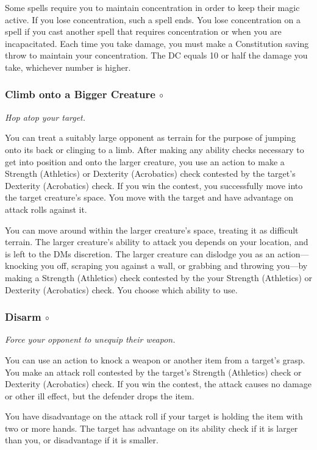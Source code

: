     Some spells require you to maintain concentration in order to keep their magic active.
    If you lose concentration, such a spell ends.
    You lose concentration on a spell if you cast another spell that requires concentration or when you are incapacitated.
    Each time you take damage, you must make a Constitution saving throw to maintain your concentration.
    The DC equals 10 or half the damage you take, whichever number is higher.

\subsubsection{Climb onto a Bigger Creature $\circ$}
    \textit{Hop atop your target.}

    You can treat a suitably large opponent as terrain for the purpose of jumping onto its back or clinging to a limb.
    After making any ability checks necessary to get into position and onto the larger creature, you use an action to make a Strength (Athletics) or Dexterity (Acrobatics) check contested by the target's Dexterity (Acrobatics) check.
    If you win the contest, you successfully move into the target creature's space.
    You move with the target and have advantage on attack rolls against it.

    You can move around within the larger creature's space, treating it as difficult terrain.
    The larger creature's ability to attack you depends on your location, and is left to the DMs discretion.
    The larger creature can dislodge you as an action—knocking you off, scraping you against a wall, or grabbing and throwing you—by making a Strength (Athletics) check contested by the your Strength (Athletics) or Dexterity (Acrobatics) check.
    You choose which ability to use.

\pagebreak

\subsubsection{Disarm $\circ$}
    \textit{Force your opponent to unequip their weapon.}

    You can use an action to knock a weapon or another item from a target's grasp.
    You make an attack roll contested by the target's Strength (Athletics) check or Dexterity (Acrobatics) check.
    If you win the contest, the attack causes no damage or other ill effect, but the defender drops the item.

    You have disadvantage on the attack roll if your target is holding the item with two or more hands.
    The target has advantage on its ability check if it is larger than you, or disadvantage if it is smaller.

